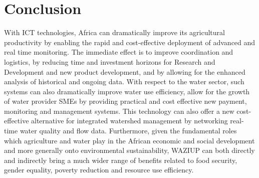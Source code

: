 
\section{Conclusion}
\label{sec:conclu}

With ICT technologies, Africa can dramatically improve its agricultural productivity by enabling the rapid and cost-effective deployment of advanced and real time monitoring.
The immediate effect is to improve coordination and logistics, by reducing time and investment horizons for Research and Development and new product development, and by allowing for the enhanced analysis of historical and ongoing data. 
With respect to the water sector, such systems can also dramatically improve water use efficiency, allow for the growth of water provider SMEs by providing practical and cost effective new payment, monitoring and management systems.
This technology can also offer a new cost-effective alternative for integrated watershed management by networking real-time water quality and flow data. 
Furthermore, given the fundamental roles which agriculture and water play in the African economic and social development and more generally onto environmental sustainability, WAZIUP can both directly and indirectly bring a much wider range of benefits related to food security, gender equality, poverty reduction and resource use efficiency.
